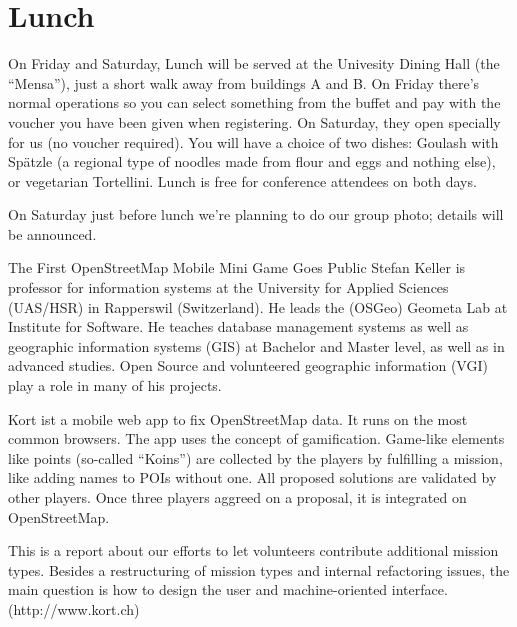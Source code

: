 \ClearWallPaper

\label{lunch}
\cropmarkswallpaper

\newpage
{}
\thispagestyle{empty}
\section*{Lunch}

On Friday and Saturday, Lunch will be served at the Univesity Dining Hall
(the ``Mensa''), just a short walk away from buildings A and B. 
On Friday there's normal operations so you can select something from 
the buffet and pay with the voucher you have been given when registering. 
On Saturday, they open specially for us (no voucher required). You will have a 
choice of two dishes: Goulash with Spätzle (a regional type of noodles made 
from flour and eggs and nothing else), or vegetarian Tortellini.
Lunch is free for conference attendees on both days.

On Saturday just before lunch we're planning to do our group photo; 
details will be announced.
\cropmarkswallpaper

%
{The First OpenStreetMap Mobile Mini Game Goes Public}%
{Stefan Keller is professor for information systems at the University for Applied Sciences (UAS/HSR) in Rapperswil (Switzerland). He leads the (OSGeo) Geometa Lab at Institute for Software. He teaches database management systems as well as geographic information systems (GIS) at Bachelor and Master level, as well as in advanced studies. Open Source and volunteered geographic information (VGI) play a role in many of his projects. }%
{Kort ist a mobile web app to fix OpenStreetMap data. It runs on the most common browsers. The app uses the concept of gamification. Game-like elements like points (so-called ``Koins'') are collected by the players by fulfilling a mission, like adding names to POIs without one. All proposed solutions are validated by other players. Once three players aggreed on a proposal, it is integrated on OpenStreetMap.

This is a report about our efforts to let volunteers contribute additional mission types. Besides a restructuring of mission types and internal refactoring issues, the main question is how to design the user and machine-oriented interface. (http://www.kort.ch)}



